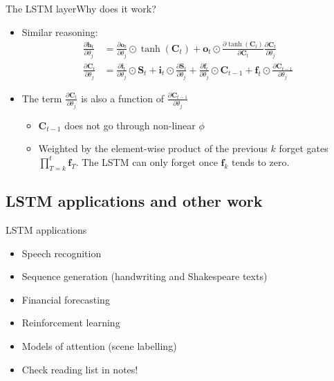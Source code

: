 \documentclass[handout]{beamer}
\theoremstyle{definition}
\theoremstyle{remark}
\newcommand*{\V}[1]{\mathbf{#1}}%
\newcommand{\parder}[2]{\frac{\partial{#1}}{\partial{#2}}}
\begin{document}
\begin{frame}{The LSTM layer}{Why does it work?}
  \begin{itemize}
      \item {Similar reasoning: \pause
      \begin{align*}
    \parder{\V{h}_t}{\theta_j} &= \parder{\V{o}_t}{\theta_j}\odot\tanh(\V{C}_t) + \V{o}_t\odot\parder{\tanh(\V{C}_t)}{\V{C}_t}\parder{\V{C}_t}{\theta_j}\\
    \parder{\V{C}_t}{\theta_j} &= \parder{\V{i}_t}{\theta_j}\odot\V{S}_t +  \V{i}_t\odot\parder{\V{S}_t}{\theta_j} + \parder{\V{f}_t}{\theta_j}\odot\V{C}_{t-1} + \V{f}_t\odot\parder{\V{C}_{t-1}}{\theta_j}
\end{align*} \pause
    }
    
    \item{The term $\parder{\V{C}_t}{\theta_j}$ is also a function of $\parder{\V{C}_{t-1}}{\theta_j}$\pause
    \begin{itemize}
        \item {$\V{C}_{t-1}$ does not go through non-linear $\phi$\pause}
        \item{Weighted by the element-wise product of the previous $k$ forget gates $\prod_{T=k}^t\V{f}_T$. The LSTM can only forget once $\V{f}_k$ tends to zero.}
    \end{itemize}
    }
  \end{itemize}
\end{frame}

\subsection{LSTM applications and other work}
\begin{frame}{LSTM applications}
  \begin{itemize}
      \item Speech recognition \pause
      \item Sequence generation (handwriting and Shakespeare texts) \pause
      \item Financial forecasting \pause
      \item Reinforcement learning \pause
      \item Models of attention (scene labelling) \pause
      \item Check reading list in notes!
  \end{itemize}
\end{frame}
\end{document}
